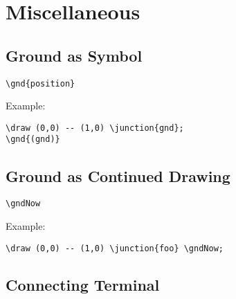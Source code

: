 \documentclass[parskip=full]{scrartcl}
\begin{document}
\section{Miscellaneous}

\subsection{Ground as Symbol}

\begin{verbatim}
\gnd{position}
\end{verbatim}

Example:\\
\begin{minipage}{0.8\textwidth}
\begin{verbatim}
\draw (0,0) -- (1,0) \junction{gnd};
\gnd{(gnd)}
\end{verbatim}
\end{minipage}
\begin{minipage}{0.19\textwidth}
\end{minipage}

\subsection{Ground as Continued Drawing}

\begin{verbatim}
\gndNow
\end{verbatim}

Example:\\
\begin{minipage}{0.8\textwidth}
\begin{verbatim}
\draw (0,0) -- (1,0) \junction{foo} \gndNow;
\end{verbatim}
\end{minipage}
\begin{minipage}{0.19\textwidth}
\end{minipage}

\subsection{Connecting Terminal}
\end{document}
